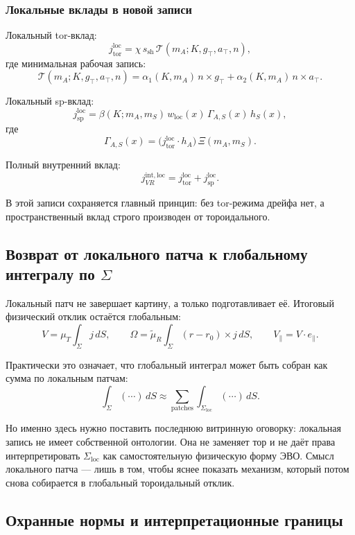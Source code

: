 \subsubsection{Локальные вклады в новой записи}

Локальный tor-вклад:
\[
j_{\mathrm{tor}}^{\mathrm{loc}}
=
\chi\, s_{\mathrm{sh}}\,
\mathcal{T}(m_A;K,g_\top,a_\top,n),
\]
где минимальная рабочая запись:
\[
\mathcal{T}(m_A;K,g_\top,a_\top,n)
=
\alpha_1(K,m_A)\,n\times g_\top
+
\alpha_2(K,m_A)\,n\times a_\top.
\]

Локальный sp-вклад:
\[
j_{\mathrm{sp}}^{\mathrm{loc}}
=
\beta(K;m_A,m_S)\,
w_{\mathrm{loc}}(x)\,
\Gamma_{A,S}(x)\,
h_S(x),
\]
где
\[
\Gamma_{A,S}(x)=
\bigl(j_{\mathrm{tor}}^{\mathrm{loc}}\cdot h_A\bigr)\,
\Xi(m_A,m_S).
\]

Полный внутренний вклад:
\[
j_{VR}^{\mathrm{int,loc}}
=
j_{\mathrm{tor}}^{\mathrm{loc}}
+
j_{\mathrm{sp}}^{\mathrm{loc}}.
\]

В этой записи сохраняется главный принцип: без tor-режима дрейфа нет, а пространственный вклад строго производен от тороидального.

\subsection{Возврат от локального патча к глобальному интегралу по \(\Sigma\)}

Локальный патч не завершает картину, а только подготавливает её. Итоговый физический отклик остаётся глобальным:
\[
V=\mu_T\int_{\Sigma} j\,dS,
\qquad
\Omega=\tilde\mu_R\int_{\Sigma}(r-r_0)\times j\,dS,
\qquad
V_\parallel=V\cdot e_\parallel.
\]

Практически это означает, что глобальный интеграл может быть собран как сумма по локальным патчам:
\[
\int_{\Sigma}(\cdots)\,dS
\approx
\sum_{\mathrm{patches}}
\int_{\Sigma_{\mathrm{loc}}}(\cdots)\,dS.
\]

Но именно здесь нужно поставить последнюю витринную оговорку: локальная запись не имеет собственной онтологии. Она не заменяет тор и не даёт права интерпретировать \(\Sigma_{\mathrm{loc}}\) как самостоятельную физическую форму ЭВО. Смысл локального патча --- лишь в том, чтобы яснее показать механизм, который потом снова собирается в глобальный тороидальный отклик.

\subsection{Охранные нормы и интерпретационные границы}

